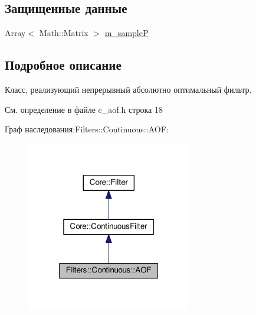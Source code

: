\subsection*{Защищенные данные}
\begin{DoxyCompactItemize}
\item 
Array$<$ Math\+::\+Matrix $>$ \hyperlink{class_filters_1_1_continuous_1_1_a_o_f_a3cff90f7e12e677f04102f1717ef7a49}{m\+\_\+sampleP}
\end{DoxyCompactItemize}


\subsection{Подробное описание}
Класс, реализующий непрерывный абсолютно оптимальный фильтр. 

См. определение в файле c\+\_\+aof.\+h строка 18



Граф наследования\+:Filters\+:\+:Continuous\+:\+:A\+OF\+:
\nopagebreak
\begin{figure}[H]
\begin{center}
\leavevmode
\includegraphics[width=205pt]{class_filters_1_1_continuous_1_1_a_o_f__inherit__graph}
\end{center}
\end{figure}


